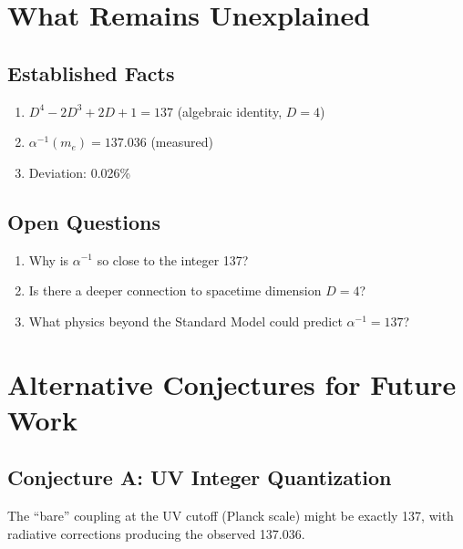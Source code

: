 \documentclass[11pt,a4paper]{article}
\begin{document}
\section{What Remains Unexplained}

\subsection{Established Facts}

\begin{enumerate}
    \item $D^4 - 2D^3 + 2D + 1 = 137$ (algebraic identity, $D=4$)
    \item $\alpha^{-1}(m_e) = 137.036$ (measured)
    \item Deviation: 0.026\%
\end{enumerate}

\subsection{Open Questions}

\begin{enumerate}
    \item Why is $\alpha^{-1}$ so close to the integer 137?
    \item Is there a deeper connection to spacetime dimension $D=4$?
    \item What physics beyond the Standard Model could predict $\alpha^{-1} = 137$?
\end{enumerate}

\section{Alternative Conjectures for Future Work}

\subsection{Conjecture A: UV Integer Quantization}

The ``bare'' coupling at the UV cutoff (Planck scale) might be exactly 137, with radiative corrections producing the observed 137.036.
\end{document}

